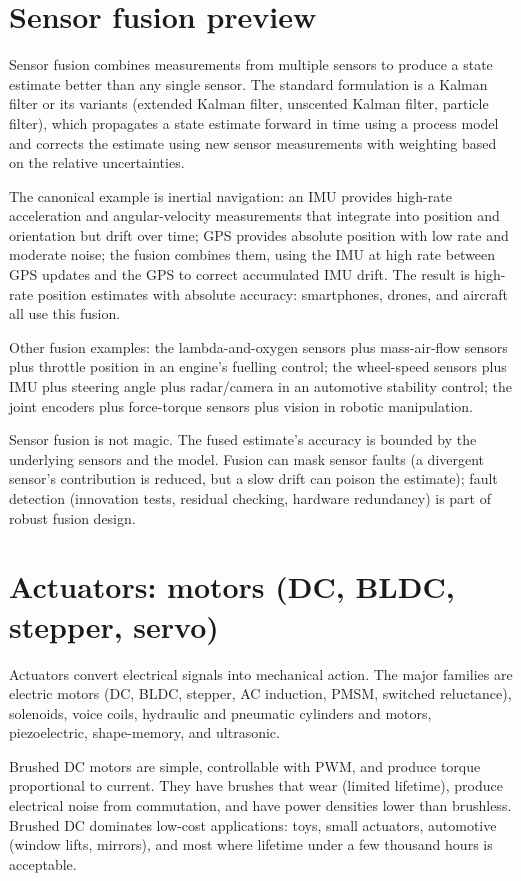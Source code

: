 \section{Sensor fusion preview}

Sensor fusion combines measurements from multiple sensors to produce a state estimate better than any single sensor. The standard formulation is a Kalman filter or its variants (extended Kalman filter, unscented Kalman filter, particle filter), which propagates a state estimate forward in time using a process model and corrects the estimate using new sensor measurements with weighting based on the relative uncertainties.

The canonical example is inertial navigation: an IMU provides high-rate acceleration and angular-velocity measurements that integrate into position and orientation but drift over time; GPS provides absolute position with low rate and moderate noise; the fusion combines them, using the IMU at high rate between GPS updates and the GPS to correct accumulated IMU drift. The result is high-rate position estimates with absolute accuracy: smartphones, drones, and aircraft all use this fusion.

Other fusion examples: the lambda-and-oxygen sensors plus mass-air-flow sensors plus throttle position in an engine's fuelling control; the wheel-speed sensors plus IMU plus steering angle plus radar/camera in an automotive stability control; the joint encoders plus force-torque sensors plus vision in robotic manipulation.

Sensor fusion is not magic. The fused estimate's accuracy is bounded by the underlying sensors and the model. Fusion can mask sensor faults (a divergent sensor's contribution is reduced, but a slow drift can poison the estimate); fault detection (innovation tests, residual checking, hardware redundancy) is part of robust fusion design.

\section{Actuators: motors (DC, BLDC, stepper, servo)}

Actuators convert electrical signals into mechanical action. The major families are electric motors (DC, BLDC, stepper, AC induction, PMSM, switched reluctance), solenoids, voice coils, hydraulic and pneumatic cylinders and motors, piezoelectric, shape-memory, and ultrasonic.

Brushed DC motors are simple, controllable with PWM, and produce torque proportional to current. They have brushes that wear (limited lifetime), produce electrical noise from commutation, and have power densities lower than brushless. Brushed DC dominates low-cost applications: toys, small actuators, automotive (window lifts, mirrors), and most where lifetime under a few thousand hours is acceptable.

